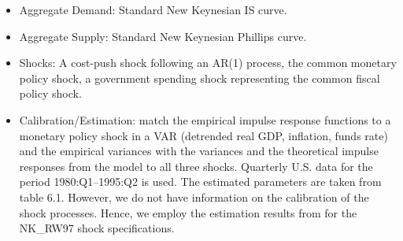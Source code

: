 \documentclass[11pt,a4paper]{article}
\begin{document}
	\begin{itemize}
		\item Aggregate Demand: Standard New Keynesian IS curve.
		\item Aggregate Supply: Standard New Keynesian Phillips curve.
		\item Shocks: A cost-push shock following an AR(1) process, the common monetary policy shock, a government spending shock representing the common fiscal policy shock.
		\item Calibration/Estimation: \cite{RotembergWoodford1997} match the empirical impulse
		response functions to a monetary policy shock in a VAR (detrended
		real GDP, inflation, funds rate) and the empirical variances with
		the variances and the theoretical impulse responses from the model
		to all three shocks. Quarterly U.S. data for the period 1980:Q1--1995:Q2 is
		used. The estimated parameters are taken from \cite{Woodford2003}
		table 6.1. However, we do not have information on the calibration of the shock processes. Hence, we employ the estimation results from \cite{adam2006optimal} for the NK\_RW97 shock specifications.
	\end{itemize}
	
\end{document}
